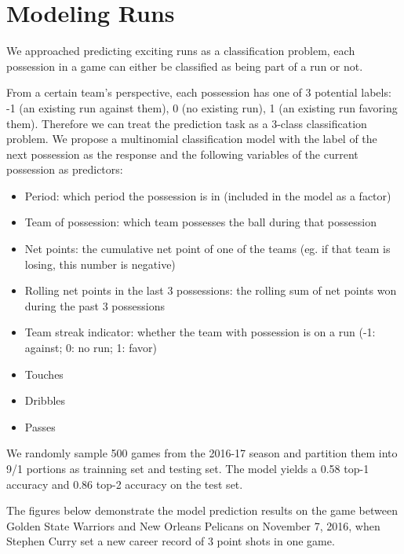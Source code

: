 \documentclass{article}
\begin{document}
\section{Modeling Runs}

We approached predicting exciting runs as a classification problem, each possession in a game can either be classified as being part of a run or not. \newline

From a certain team's perspective, each possession has one of 3 potential labels: -1 (an existing run against them), 0 (no existing run), 1 (an existing run favoring them). Therefore we can treat the prediction task as a 3-class classification problem. We propose a multinomial classification model with the label of the next possession as the response and the following variables of the current possession as predictors:\newline

\begin{itemize}
   \item  Period: which period the possession is in (included in the model as a factor)
   \item  Team of possession: which team possesses the ball during that possession
   \item  Net points: the cumulative net point of one of the teams (eg. if that team is losing, this number is negative)
   \item  Rolling net points in the last 3 possessions: the rolling sum of net points won during the past 3 possessions
   \item  Team streak indicator: whether the team with possession is on a run (-1: against; 0: no run; 1: favor)
   \item  Touches
   \item  Dribbles
   \item  Passes
\end{itemize}

We randomly sample 500 games from the 2016-17 season and partition them into 9/1 portions as trainning set and testing set. The model yields a 0.58 top-1 accuracy and 0.86 top-2 accuracy on the test set.\newline

The figures below demonstrate the model prediction results on the game between Golden State Warriors and New Orleans Pelicans on November 7, 2016, when Stephen Curry set a new career record of 3 point shots in one game. \newline
\end{document}
